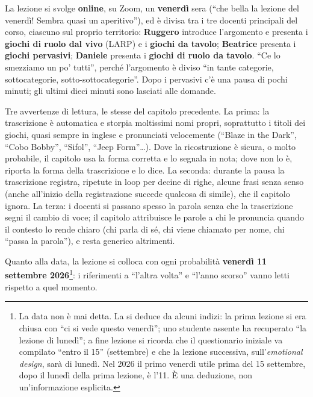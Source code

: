 La lezione si svolge \textbf{online}, su Zoom, un \textbf{venerdì} sera (``che
bella la lezione del venerdì! Sembra quasi un aperitivo''), ed è divisa tra i
tre docenti principali del corso, ciascuno sul proprio territorio:
\textbf{Ruggero} introduce l'argomento e presenta i \textbf{giochi di ruolo dal
vivo} (LARP) e i \textbf{giochi da tavolo}; \textbf{Beatrice} presenta i
\textbf{giochi pervasivi}; \textbf{Daniele} presenta i \textbf{giochi di ruolo
da tavolo}. ``Ce lo smezziamo un po' tutti'', perché l'argomento è diviso ``in
tante categorie, sottocategorie, sotto-sottocategorie''. Dopo i pervasivi c'è
una pausa di pochi minuti; gli ultimi dieci minuti sono lasciati alle domande.

Tre avvertenze di lettura, le stesse del capitolo precedente. La prima: la
trascrizione è automatica e storpia moltissimi nomi propri, soprattutto i titoli
dei giochi, quasi sempre in inglese e pronunciati velocemente (``Blaze in the
Dark'', ``Cobo Bobby'', ``Sifol'', ``Jeep Form''\ldots). Dove la ricostruzione è
sicura, o molto probabile, il capitolo usa la forma corretta e lo segnala in
nota; dove non lo è, riporta la forma della trascrizione e lo dice. La seconda:
durante la pausa la trascrizione registra, ripetute in loop per decine di righe,
alcune frasi senza senso (anche all'inizio della registrazione succede qualcosa
di simile), che il capitolo ignora. La terza: i docenti si passano spesso la
parola senza che la trascrizione segni il cambio di voce; il capitolo attribuisce
le parole a chi le pronuncia quando il contesto lo rende chiaro (chi parla di sé,
chi viene chiamato per nome, chi ``passa la parola''), e resta generico
altrimenti.

Quanto alla data, la lezione si colloca con ogni probabilità \textbf{venerdì 11
settembre 2026}\footnote{La data non è mai detta. La si deduce da alcuni
indizi: la prima lezione si era chiusa con ``ci si vede questo venerdì''; uno
studente assente ha recuperato ``la lezione di lunedì''; a fine lezione si
ricorda che il questionario iniziale va compilato ``entro il 15'' (settembre) e
che la lezione successiva, sull'\emph{emotional design}, sarà di lunedì. Nel
2026 il primo venerdì utile prima del 15 settembre, dopo il lunedì della prima
lezione, è l'11. È una deduzione, non un'informazione esplicita.}: i riferimenti
a ``l'altra volta'' e ``l'anno scorso'' vanno letti rispetto a quel momento.


